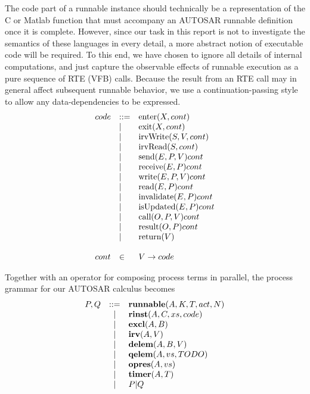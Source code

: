 \documentclass[twocolumn]{article}
\begin{document}
The code part of a runnable instance should technically be a representation of the C or Matlab function that must accompany an AUTOSAR runnable definition once it is complete. However, since our task in this report is not to investigate the semantics of these languages in every detail, a more abstract notion of executable code will be required. To this end, we have chosen to ignore all details of internal computations, and just capture the observable effects of runnable execution as a pure sequence of RTE (VFB) calls. Because the result from an RTE call may in general affect subsequent runnable behavior, we use a continuation-passing style to allow any data-dependencies to be expressed.
\[
\begin{array}{lll}
	\Code	& ::=	& \Enter{X}{\Cont}			\\
			& |	& \Exit{X}{\Cont}			\\
			& |	& \IrvWrite{S}{V}{\Cont}		\\
			& |	& \IrvRead{S}{\Cont}			\\
			& |	& \Send{E}{P}{V}{\Cont}		\\
			& |	& \Receive{E}{P}{\Cont}		\\
			& |	& \Write{E}{P}{V}{\Cont}		\\
			& |	& \Read{E}{P}{\Cont}		\\
			& |	& \Invalidate{E}{P}{\Cont}		\\
			& |	& \IsUpdated{E}{P}{\Cont}		\\
			& |	& \Call{O}{P}{V}{\Cont}		\\
			& |	& \Result{O}{P}{\Cont}		\\
			& |	& \Return{V}				\\
	\\
	\Cont	& \in	& V \rightarrow \Code		\\
\end{array}
\]

Together with an operator for composing process terms in parallel, the process grammar for our AUTOSAR calculus becomes
\[
\begin{array}{rcll}
	P,Q 	& ::= &
		\runnable{A}{K}{T}{\Act}{N}	\\
		& | &
		\rinst{A}{C}{\Xs}{\Code}	\\
		& | &
		\excl{A}{B}			\\
		& | &
		\irv{A}{V}				\\
		& | &
		\delem{A}{B}{V}			\\
		& | &
		\qelem{A}{\Vs}{TODO}			\\
		& | &
		\opres{A}{\Vs}			\\
		& | &
		\timer{A}{T}		\\
		& | &
		P|Q					\\
\end{array}
\]
\end{document}

